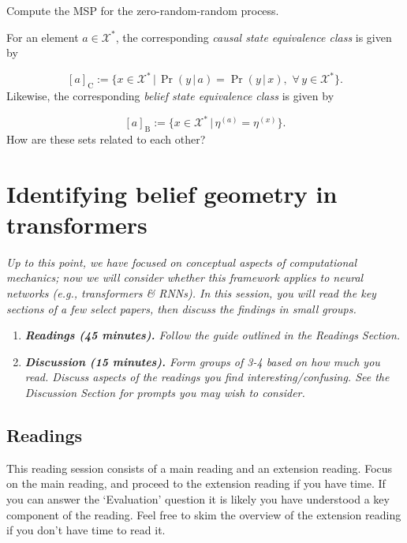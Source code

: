 \documentclass[11pt]{article}
\begin{document}
\begin{exercise}
\label{ex:pred-ext-3}
Compute the MSP for the zero-random-random process.
\end{exercise}

\begin{exercise}
\label{ex:pred-ext-4}
For an element \(a\in \mathcal{X}^*\), the corresponding \emph{causal state equivalence class} is given by

\[
[a]_{\mathrm{C}} := \{x \in \mathcal{X}^*\,|\, \Pr(y\,|\, a) = \Pr(y\,|\, x) ,\,\,\forall\,y\in\mathcal{X}^*  \} .
\]
Likewise, the corresponding \emph{belief state equivalence class} is given by

\[
[a]_{\mathrm{B}} := \{x \in \mathcal{X}^*\,|\, \eta^{(a)} = \eta^{(x)}  \} .
\]
How are these sets related to each other?
\end{exercise}


\section{Identifying belief geometry in transformers}\label{belief-geometry}
\emph{Up to this point, we have focused on conceptual aspects of computational mechanics; now we will consider whether this framework applies to neural networks (e.g., transformers \& RNNs). In this session, you will read the key sections of a few select papers, then discuss the findings in small groups.}

\begin{enumerate}
\item
  \emph{\textbf{Readings (45 minutes).} Follow the guide outlined in the Readings Section.}
\item
  \emph{\textbf{Discussion (15 minutes).} Form groups of 3-4 based on how much you read. Discuss aspects of the readings you find interesting/confusing. See the Discussion Section for prompts you may wish to consider.}
\end{enumerate}

\subsection{Readings }\label{readings}

This reading session consists of a main reading and an extension reading. Focus on the main reading, and proceed to the extension reading if you have time. If you can answer the `Evaluation' question it is likely you have understood a key component of the reading. Feel free to skim the overview of the extension reading if you don't have time to read it.
\end{document}
